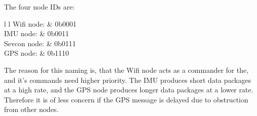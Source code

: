 The four node IDs are:
\begin{table}[h]
	\begin{tabular}{{l} {l}}
		Wifi node: & 0b0001 \\
		IMU node: & 0b0011 \\
		Sevcon node: & 0b0111 \\
		GPS node: & 0b1110
	\end{tabular}
\end{table}

The reason for this naming is, that the Wifi node acts as a commander for the, and it's commands need higher priority.
The IMU produces short data packages at a high rate, and the GPS node produces longer data packages at a lower rate. 
Therefore it is of less concern if the GPS message is delayed due to obstruction from other nodes. 

